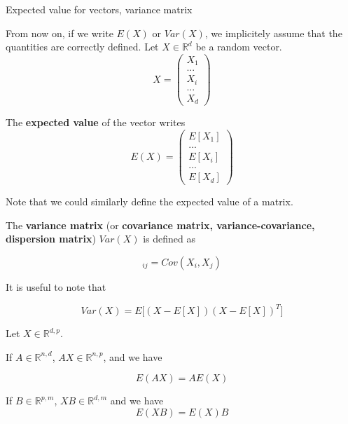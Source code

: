 \documentclass[
10pt, %
a4paper, %
oneside, %
headinclude,footinclude, %
BCOR5mm, %
]{scrartcl}
\begin{document}
\begin{definition}{Expected value for vectors, variance matrix}

    From now on, if we write $E(X)$ or $Var(X)$, we implicitely assume that the quantities are correctly defined. Let $X\in \mathbb{R}^d$ be a random vector.
\begin{equation*}
X=\begin{pmatrix}
X_{1}\\
...\\
X_{i}\\
...\\
X_{d}
\end{pmatrix}
\end{equation*}

The \textbf{{expected value}} of the vector writes
\begin{equation*}
    E(X)=\begin{pmatrix}
    E[X_{1}]\\
...\\
    E[X_{i}]\\
...\\
    E[X_{d}]
\end{pmatrix}
\end{equation*}

Note that we could similarly define the expected value of a matrix.

    The \textbf{{variance matrix}} (or \textbf{{covariance matrix, variance-covariance, dispersion matrix}})  $Var(X)$ is defined as

    \begin{equation*}
	[Var(X)]_{ij} = Cov(X_i, X_j)       
    \end{equation*}
\end{definition}

\begin{remark}
    It is useful to note that

    \begin{equation}
	Var(X) = E\Big[ (X-E[X])(X-E[X])^T\Big]
    \end{equation}
\end{remark}

\begin{lemma}
    Let $X \in \mathbb{R}^{d, p}$.

    If $A\in \mathbb{R}^{n,d}$, $AX\in \mathbb{R}^{n,p}$, and we have

    \begin{equation*}
	E(AX)=AE(X)
    \end{equation*}
    
    If $B\in \mathbb{R}^{p, m}$, $XB \in \mathbb{R}^{d, m}$ and we have
    \begin{equation*}
	E(XB)=E(X)B
    \end{equation*}
\end{lemma}
\end{document}
